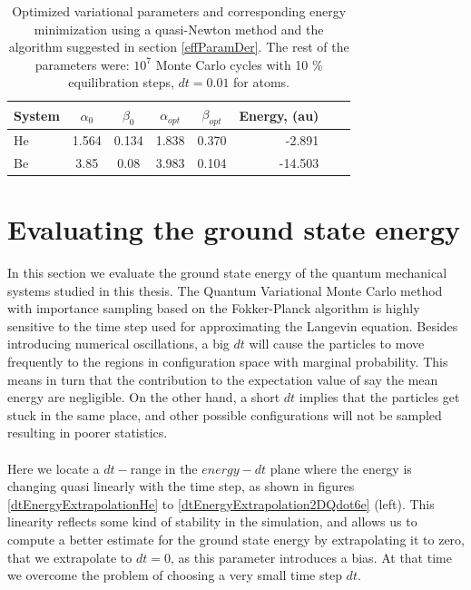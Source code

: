 \begin{table}[!hbt]
\centering
\begin{tabular}{lccccrcc}
\toprule[1pt]
\textbf{System} & $\alpha_{0}$ & $\beta_{0}$ & $\alpha_{opt}$ & $\beta_{opt}$ &\textbf{Energy}, (au)\\
\midrule[1pt]
He 							& 1.564  & 0.134		& 1.838 	&  0.370 	& -2.891 	 \\
Be 							& 3.85 	& 0.08		& 3.983   &  0.104	&   -14.503	 \\
\bottomrule[1pt]
\end{tabular}\caption{Optimized variational parameters and corresponding energy minimization using a quasi-Newton method and the algorithm suggested in section \ref{effParamDer}. The rest of the parameters were: $10^7$ Monte Carlo cycles with 10 \% equilibration steps, $dt = 0.01$ for atoms.}\label{optizedQuasiNewtonParameters}
\end{table}





\section{Evaluating the ground state energy}

In this section we evaluate the ground state energy of the quantum mechanical systems studied in this thesis. The Quantum Variational Monte Carlo method with importance sampling based on the Fokker-Planck algorithm is highly sensitive to the time step used for approximating the Langevin equation. Besides introducing numerical oscillations, a big $dt$ will cause  the particles to move frequently to the regions in configuration space 
with marginal probability. This means in turn that the contribution to the expectation value of say the mean energy are negligible.
On the other hand, a short $dt$ implies that the particles get stuck in the same place, and other possible configurations will not be sampled resulting in poorer statistics.\\
\\
\noindent
Here we locate a $dt-$range in the $energy-dt$ plane where the energy is changing quasi linearly with the time step, as shown in figures \ref{dtEnergyExtrapolationHe} to \ref{dtEnergyExtrapolation2DQdot6e} (left). This linearity reflects some kind of stability in the simulation, and allows us to compute a better estimate for the ground state energy by extrapolating it to zero, that we extrapolate to $dt=0$, as this parameter introduces a bias\cite{Thijssen, Bressanini2003}. At that time we overcome the problem 
of choosing a very small time step $dt$.\\

